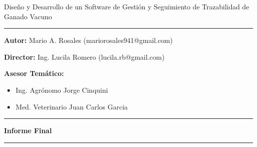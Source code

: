 \documentclass[11pt,oneside]{book}
\begin{document}
\doublespacing
\begin{center}
\LARGE Diseño y Desarrollo de un Software de Gestión y Seguimiento de Trazabilidad de Ganado Vacuno
\end{center}

\vspace{0.25cm}
\begin{center}
\rule{\textwidth}{.4pt}
\end{center}
\vspace{0.25cm}


\textbf{Autor:} Mario A. Rosales (mariorosales941@gmail.com)

\textbf{Director:} Ing. Lucila Romero (lucila.rb@gmail.com)


\textbf{Asesor Temático:}
\begin{itemize}
\item Ing. Agrónomo Jorge Cinquini
\item Med. Veterinario Juan Carlos Garcia
\end{itemize}

\begin{center}
\rule{\textwidth}{.4pt}
\end{center}
\vspace{3.5mm}

\begin{center}
\textbf{\Large Informe Final}
\end{center}

\begin{center}
\rule{\textwidth}{.4pt}
\end{center}

\setlength{\parskip}{5mm}


\clearpage
\newpage
\setlength{\cftbeforetoctitleskip}{0pt}			

\renewcommand{\cfttoctitlefont}{\Large\bfseries}	
\tableofcontents
\end{document}

